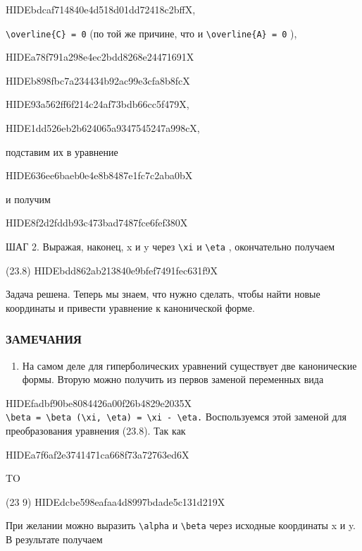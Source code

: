 \documentclass[
  ukrainian,
]{article}
\providecommand{\tightlist}{%
  \setlength{\itemsep}{0pt}\setlength{\parskip}{0pt}}
\begin{document}
HIDEbdcaf714840e4d518d01dd72418c2bffX,

\texttt{\textbackslash{}overline\{C\}\ =\ 0} (по той же причине, что и
\texttt{\textbackslash{}overline\{A\}\ =\ 0} ),

HIDEa78f791a298e4ec2bdd8268e24471691X

HIDEb898fbc7a234434b92ac99e3cfa8b8fcX

HIDE93a562ff6f214c24af73bdb66cc5f479X,

HIDE1dd526eb2b624065a9347545247a998cX,

подставим их в уравнение

HIDE636ee6baeb0e4e8b8487e1fc7c2aba0bX

и получим

HIDE8f2d2fddb93c473bad7487fce6fef380X

ШАГ 2. Выражая, наконец, x и y через \texttt{\textbackslash{}xi} и
\texttt{\textbackslash{}eta} , окончательно получаем

(23.8) HIDEbdd862ab213840e9bfef7491fec631f9X

Задача решена. Теперь мы знаем, что нужно сделать, чтобы найти новые
координаты и привести уравнение к канонической форме.

\subsubsection{ЗАМЕЧАНИЯ}\label{ux437ux430ux43cux435ux447ux430ux43dux438ux44f}

\begin{enumerate}
\def\labelenumi{\arabic{enumi}.}
\tightlist
\item
  На самом деле для гиперболических уравнений существует две
  канонические формы. Вторую можно получить из первов заменой переменных
  вида
\end{enumerate}

HIDEfadbf90be8084426a00f26b4829e2035X
\texttt{\textbackslash{}beta\ =\ \textbackslash{}beta\ (\textbackslash{}xi,\ \textbackslash{}eta)\ =\ \textbackslash{}xi\ -\ \textbackslash{}eta.}
Воспользуемся этой заменой для преобразования уравнения (23.8). Так как

HIDEa7f6af2e3741471ca668f73a72763ed6X

TO

(23 9) HIDEdcbe598eafaa4d8997bdade5c131d219X

При желании можно выразить \texttt{\textbackslash{}alpha} и
\texttt{\textbackslash{}beta} через исходные координаты x и y. В
результате получаем
\end{document}
